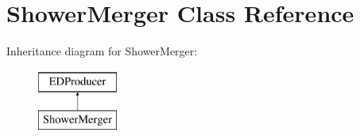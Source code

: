 \hypertarget{classShowerMerger}{\section{Shower\-Merger Class Reference}
\label{classShowerMerger}
}
Inheritance diagram for Shower\-Merger\-:\begin{figure}[H]
\begin{center}
\leavevmode
\includegraphics[height=2.000000cm]{classShowerMerger}
\end{center}
\end{figure}
